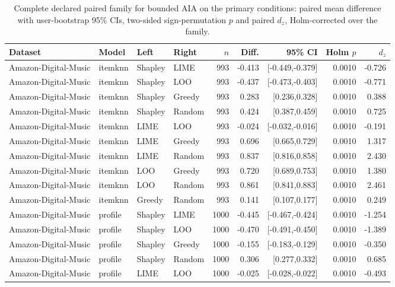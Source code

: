 \begin{table}[!htbp]\centering\scriptsize\setlength{\tabcolsep}{3pt}
\caption{Complete declared paired family for bounded AIA on the primary
conditions: paired mean difference with user-bootstrap 95\% CIs, two-sided
sign-permutation $p$ and paired $d_z$, Holm-corrected over the family.}
\label{tab:paired-full}
\begin{tabular}{@{}llllrrrrr@{}}
\toprule
Dataset & Model & Left & Right & $n$ & Diff. & 95\% CI & Holm $p$ & $d_z$ \\
\midrule
Amazon-Digital-Music & itemknn & Shapley & LIME & 993 & -0.413 & [-0.449,-0.379] & 0.0010 & -0.726 \\
Amazon-Digital-Music & itemknn & Shapley & LOO & 993 & -0.437 & [-0.473,-0.403] & 0.0010 & -0.771 \\
Amazon-Digital-Music & itemknn & Shapley & Greedy & 993 & 0.283 & [0.236,0.328] & 0.0010 & 0.388 \\
Amazon-Digital-Music & itemknn & Shapley & Random & 993 & 0.424 & [0.387,0.459] & 0.0010 & 0.725 \\
Amazon-Digital-Music & itemknn & LIME & LOO & 993 & -0.024 & [-0.032,-0.016] & 0.0010 & -0.191 \\
Amazon-Digital-Music & itemknn & LIME & Greedy & 993 & 0.696 & [0.665,0.729] & 0.0010 & 1.317 \\
Amazon-Digital-Music & itemknn & LIME & Random & 993 & 0.837 & [0.816,0.858] & 0.0010 & 2.430 \\
Amazon-Digital-Music & itemknn & LOO & Greedy & 993 & 0.720 & [0.689,0.753] & 0.0010 & 1.380 \\
Amazon-Digital-Music & itemknn & LOO & Random & 993 & 0.861 & [0.841,0.883] & 0.0010 & 2.461 \\
Amazon-Digital-Music & itemknn & Greedy & Random & 993 & 0.141 & [0.107,0.177] & 0.0010 & 0.249 \\
Amazon-Digital-Music & profile & Shapley & LIME & 1000 & -0.445 & [-0.467,-0.424] & 0.0010 & -1.254 \\
Amazon-Digital-Music & profile & Shapley & LOO & 1000 & -0.470 & [-0.491,-0.450] & 0.0010 & -1.389 \\
Amazon-Digital-Music & profile & Shapley & Greedy & 1000 & -0.155 & [-0.183,-0.129] & 0.0010 & -0.350 \\
Amazon-Digital-Music & profile & Shapley & Random & 1000 & 0.306 & [0.277,0.332] & 0.0010 & 0.685 \\
Amazon-Digital-Music & profile & LIME & LOO & 1000 & -0.025 & [-0.028,-0.022] & 0.0010 & -0.493 \\

\end{tabular}
\end{table}
